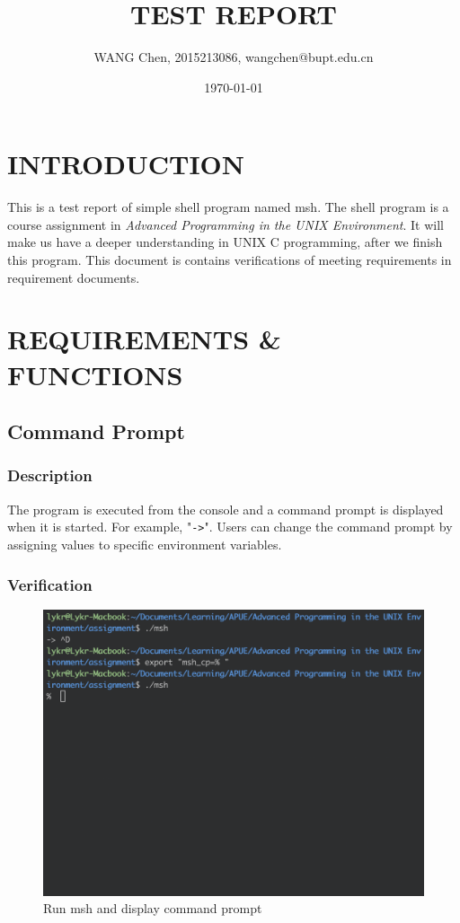 \documentclass{article}
\title{TEST REPORT}
\author{WANG Chen, 2015213086, wangchen@bupt.edu.cn}
\date{\today}
\begin{document}
\maketitle

\tableofcontents

\newpage
\section{INTRODUCTION}

This is a test report of simple shell program named msh.
The shell program is a course assignment in \emph{Advanced Programming in the UNIX Environment}.
It will make us have a deeper understanding in UNIX C programming, after we finish this program.
This document is contains verifications of meeting requirements in requirement documents.

\newpage
\section{REQUIREMENTS \& FUNCTIONS}

\subsection{Command Prompt}

\subsubsection{Description}

The program is executed from the console and a command prompt is displayed when it is started. For example, "\verb|->|". Users can change the command prompt by assigning values to specific environment variables.

\subsubsection{Verification}

\begin{figure}[h]
\centering
\includegraphics[scale=0.5]{fig/v1-1.png}
\caption{Run msh and display command prompt}
\end{figure}
\end{document}
